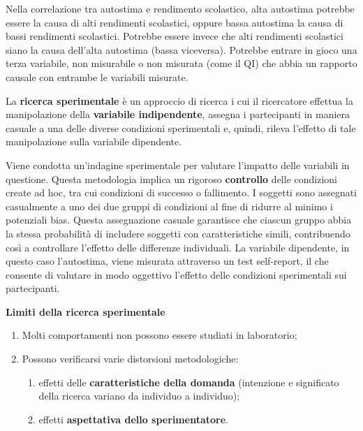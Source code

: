 \documentclass{subfiles}
\begin{document}
        Nella correlazione tra autostima e rendimento scolastico, alta autostima potrebbe essere 
        la causa di alti rendimenti scolastici, oppure bassa autostima la causa di bassi rendimenti 
        scolastici. Potrebbe essere invece che alti rendimenti scolastici siano la causa dell'alta 
        autostima (bassa viceversa).
        Potrebbe entrare in gioco una terza variabile, non misurabile o non misurata (come il QI) 
        che abbia un rapporto causale con entrambe le variabili misurate. 

        La \textbf{ricerca sperimentale} è un approccio di ricerca i cui il ricercatore effettua 
        la manipolazione della \textbf{variabile indipendente}, assegna i partecipanti in maniera 
        casuale a una delle diverse condizioni sperimentali e, quindi, rileva l'effetto di tale 
        manipolazione sulla variabile dipendente. 

        Viene condotta un'indagine sperimentale per valutare l'impatto delle variabili in questione. 
        Questa metodologia implica un rigoroso \textbf{controllo} delle condizioni create 
        ad hoc, tra cui condizioni di successo o fallimento. I soggetti sono assegnati casualmente a 
        uno dei due gruppi di condizioni al fine di ridurre al minimo i potenziali bias. 
        Questa assegnazione casuale garantisce che ciascun gruppo abbia la stessa probabilità di 
        includere soggetti con caratteristiche simili, contribuendo così a controllare l'effetto 
        delle differenze individuali. La variabile dipendente, in questo caso l'autostima, viene 
        misurata attraverso un test self-report, il che consente di valutare in modo oggettivo 
        l'effetto delle condizioni sperimentali sui partecipanti.

        \textbf{Limiti della ricerca sperimentale} 
        \begin{enumerate}
            \item Molti comportamenti non possono essere studiati in laboratorio;
            \item Possono verificarsi varie distorsioni metodologiche:
            \begin{enumerate}
                \item effetti delle \textbf{caratteristiche della domanda} (intenzione e significato 
                della ricerca variano da individuo a individuo);
                \item effetti \textbf{aspettativa dello sperimentatore}.
            \end{enumerate}
        \end{enumerate}
\end{document}
